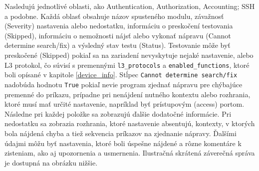 Nasledujú jednotlivé oblasti, ako Authentication, Authorization, Accounting; SSH a podobne. Každá oblasť obsahuje názov spusteného modulu, závažnosť (Severity) nastavenia alebo nedostatku, informáciu o preskočení testovania (Skipped), informáciu o nemožnosti nájsť alebo vykonať nápravu (Cannot determine search/fix) a výsledný stav testu (Status). Testovanie môže byť preskočené (Skipped) pokiaľ sa na zariadení nevyskytuje nejaké nastavenie, alebo L3 protokol, čo súvisí s premennými \texttt{l3\_protocols} a \texttt{enabled\_functions}, ktoré boli opísané v kapitole \ref{device_info}. Stĺpec \texttt{Cannot determine search/fix} nadobúda hodnotu \texttt{True} pokiaľ nevie program zjednať nápravu pre chýbajúce premenné do príkazu, prípadne pri nenájdení nutného kontextu alebo rozhrania, ktoré musí mať určité nastavenie, napríklad byť prístupovým (access) portom. Následne pri každej položke sa zobrazujú ďalšie dodatočné informácie. Pri nedostatku sa zobrazia rozhrania, ktoré nastavenie absentujú, kontexty, v ktorých bola nájdená chyba a tiež sekvencia príkazov na zjednanie nápravy. Ďalšími údajmi môžu byť nastavenia, ktoré boli úspešne nájdené a rôzne komentáre k zisteniam, ako aj upozornenia a usmernenia. Ilustračná skrátená záverečná správa je dostupná na obrázku nižšie.

